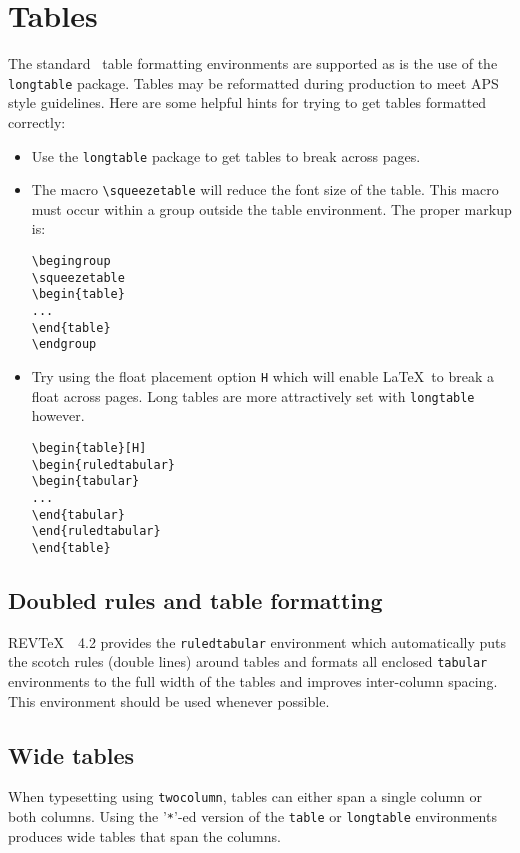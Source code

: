 \documentclass[twocolumn,secnumarabic,amssymb, nobibnotes, aps, prd]{revtex4-2}
\newcommand{\revtex}{REV\TeX\ }
\newcommand{\classoption}[1]{\texttt{#1}}
\newcommand{\macro}[1]{\texttt{\textbackslash#1}}
\newcommand{\m}[1]{\macro{#1}}
\newcommand{\env}[1]{\texttt{#1}}
\begin{document}
\section{Tables}
\label{sec:tables}
The standard \LaTeXe\ table formatting environments are supported as is
the use of the \texttt{longtable} package. Tables may be reformatted
during production to meet APS style guidelines.
Here are some helpful hints for trying to get tables formatted correctly:
\begin{itemize}
\item Use the \texttt{longtable} package to get tables to break
across pages.
\item The macro \m{squeezetable} will reduce the font size of the
table. This macro must occur within a group outside the table
environment. The proper markup is:
\begin{verbatim}
\begingroup
\squeezetable
\begin{table}
...
\end{table}
\endgroup
\end{verbatim}
\item Try using the float placement option \texttt{H} which will
enable \LaTeX\ to break a float across pages. Long tables are more
attractively set with \env{longtable} however.
\begin{verbatim}
\begin{table}[H]
\begin{ruledtabular}
\begin{tabular}
...
\end{tabular}
\end{ruledtabular}
\end{table}
\end{verbatim}
\end{itemize}

\subsection{Doubled rules and table formatting}
\revtex\ 4.2 provides the \env{ruledtabular} environment which
automatically puts the scotch rules (double lines) around tables and
formats all enclosed \env{tabular} environments to the full width of
the tables and improves inter-column spacing. This environment should
be used whenever possible.

\subsection{Wide tables}
When typesetting using \classoption{twocolumn}, tables can either span
a single column or both columns. Using the '\verb+*+'-ed version of
the \env{table} or \env{longtable} environments produces wide tables
that span the columns.
\end{document}
